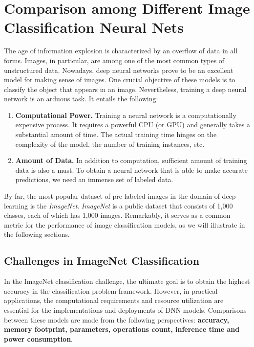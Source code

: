 \chapter{Comparison among Different Image Classification Neural Nets}
The age of information explosion is characterized by an overflow of data in all forms. Images, in particular, are among one of the most common types of unstructured data. Nowadays, deep neural networks prove to be an excellent model for making sense of images. One crucial objective of these models is to classify the object that appears in an image. Nevertheless, training a deep neural network is an arduous task. It entails the following:

\begin{enumerate}
    \item \textbf{Computational Power.}
    Training a neural network is a computationally expensive process. It requires a powerful CPU (or GPU) and generally takes a substantial amount of time. The actual training time hinges on the complexity of the model, the number of training instances, etc.
    \item \textbf{Amount of Data.}
    In addition to computation, sufficient amount of training data is also a must. To obtain a neural network that is able to make accurate predictions, we need an immense set of labeled data.
\end{enumerate}

By far, the most popular dataset of pre-labeled images in the domain of deep learning is the \textit{ImageNet}. \textit{ImageNet} is a public dataset that consists of 1,000 classes, each of which has 1,000 images. Remarkably, it serves as a common metric for the performance of image classification models, as we will illustrate in the following sections.

\section{Challenges in ImageNet Classification}
In the ImageNet classification challenge, the ultimate goal is to obtain the highest accuracy in the classification problem framework. However, in practical applications, the computational requirements and resource utilization are essential for the implementations and deployments of DNN models. Comparisons between these models are made from the following perspectives: \textbf{accuracy, memory footprint, parameters, operations count, inference time and power consumption}.

